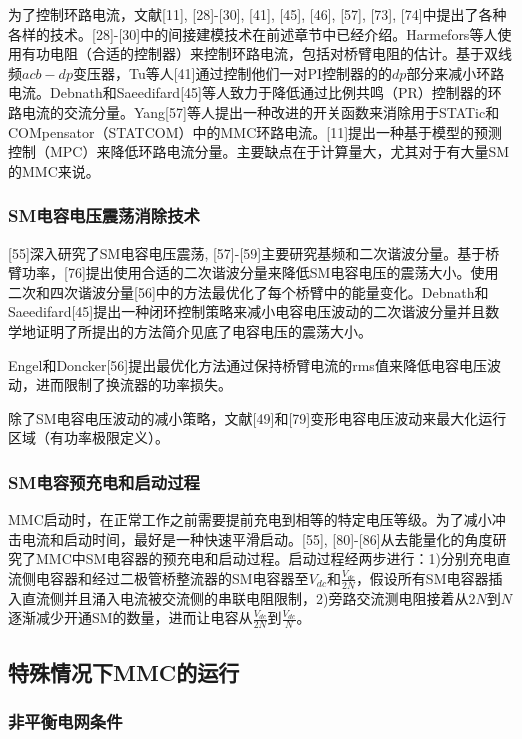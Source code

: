   为了控制环路电流，文献[11], [28]-[30], [41], [45], [46], [57], [73], [74]中提出了各种各样的技术。[28]-[30]中的间接建模技术在前述章节中已经介绍。Harmefors等人使用有功电阻（合适的控制器）来控制环路电流，包括对桥臂电阻的估计。基于双线频$acb-dp$变压器，Tu等人[41]通过控制他们一对PI控制器的的$dp$部分来减小环路电流。Debnath和Saeedifard[45]等人致力于降低通过比例共鸣（PR）控制器的环路电流的交流分量。Yang[57]等人提出一种改进的开关函数来消除用于STATic和COMpensator（STATCOM）中的MMC环路电流。[11]提出一种基于模型的预测控制（MPC）来降低环路电流分量。主要缺点在于计算量大，尤其对于有大量SM的MMC来说。
  
  \subsubsection{SM电容电压震荡消除技术}
  
  [55]深入研究了SM电容电压震荡, [57]-[59]主要研究基频和二次谐波分量。基于桥臂功率，[76]提出使用合适的二次谐波分量来降低SM电容电压的震荡大小。使用二次和四次谐波分量[56]中的方法最优化了每个桥臂中的能量变化。Debnath和Saeedifard[45]提出一种闭环控制策略来减小电容电压波动的二次谐波分量并且数学地证明了所提出的方法简介见底了电容电压的震荡大小。
  
  Engel和Doncker[56]提出最优化方法通过保持桥臂电流的rms值来降低电容电压波动，进而限制了换流器的功率损失。
  
  除了SM电容电压波动的减小策略，文献[49]和[79]变形电容电压波动来最大化运行区域（有功率极限定义）。
  
  \subsubsection{SM电容预充电和启动过程}
  
  MMC启动时，在正常工作之前需要提前充电到相等的特定电压等级。为了减小冲击电流和启动时间，最好是一种快速平滑启动。[55], [80]-[86]从去能量化的角度研究了MMC中SM电容器的预充电和启动过程。启动过程经两步进行：1)分别充电直流侧电容器和经过二极管桥整流器的SM电容器至$V_{dc}$和${\frac{V_{dc}}{2N}}$，假设所有SM电容器插入直流侧并且涌入电流被交流侧的串联电阻限制，2)旁路交流测电阻接着从$2N$到$N$逐渐减少开通SM的数量，进而让电容从$\frac{V_{dc}}{2N}$到$\frac{V_{dc}}{N}$。
  
  \subsection{特殊情况下MMC的运行}
  
  \subsubsection{非平衡电网条件}
  
